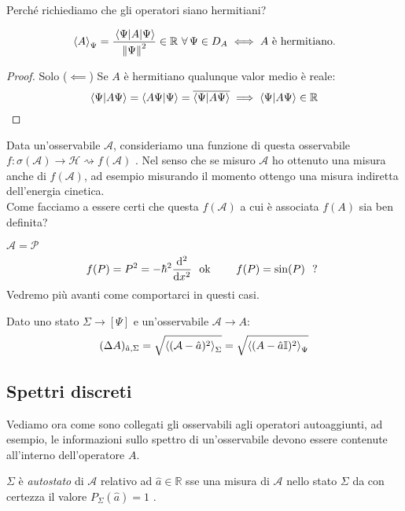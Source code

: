 Perché richiediamo che gli operatori siano hermitiani?
\begin{theorem}
    \begin{equation}
        \expval{A}_{\Psi}= \frac{\expval{A}{\Psi}}{\norm{\Psi}^2} \in \mathbb{R} \ \forall\, \Psi \in D_A \iff A \text{ è hermitiano.}
    \end{equation}
\end{theorem}
\begin{proof}
    Solo (\(\impliedby\)) Se \(A\) è hermitiano qualunque valor medio è reale:
    \[
        \braket{\Psi}{A\Psi}= \braket{A\Psi}{\Psi}= \overline{\braket{\Psi}{A\Psi}} \implies \braket{\Psi}{A\Psi} \in \mathbb{R}
    \]
\end{proof}

Data un'osservabile \(\mathcal{A}\), consideriamo una funzione di questa osservabile \(f: \sigma(\mathcal{A})\to\mathcal{H}\rightsquigarrow f(\mathcal{A})\) . 
Nel senso che se misuro \(\mathcal{A}\) ho ottenuto una misura anche di \(f(\mathcal{A})\), ad esempio misurando il momento ottengo una misura indiretta dell'energia cinetica.\\
Come facciamo a essere certi che questa \(f(\mathcal{A})\) a cui è associata \(f(A)\) sia ben definita?
\begin{example}\(\mathcal{A} = \mathcal{P}\)
    \[
        f(P) = P^2 = -\hbar^2\dv[2]{}{x} \ \text{ ok } \qquad f(P) = \sin(P) \ \text{ ? }
    \]
    Vedremo più avanti come comportarci in questi casi.
\end{example}

\begin{remark}
    Dato uno stato \(\Sigma\to [\Psi]\) e un'osservabile \(\mathcal{A} \to A \):
    \[
        (\Delta A )_{\hat{a}, \Sigma} = \sqrt{\expval{(\mathcal{A}-\hat{a})^2}_\Sigma}   = \sqrt{\expval{(A-\hat{a}\mathbb{I})^2}_{\Psi}}
    \]
\end{remark}

\subsection{Spettri discreti}

Vediamo ora come sono collegati gli osservabili agli operatori autoaggiunti,
ad esempio, le informazioni sullo spettro di un'osservabile devono essere contenute all'interno dell'operatore \(A\).
\begin{definition}
    \(\Sigma\) è \textit{autostato} di \(\mathcal{A}\) relativo ad \(\hat{a}\in \mathbb{R}\) sse una misura di \(\mathcal{A}\) nello stato
    \(\Sigma\) da con certezza il valore \(P_\Sigma(\hat{a})=1\) .
\end{definition}

